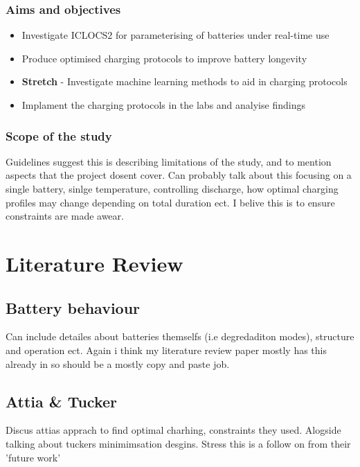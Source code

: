 \documentclass[12pt]{article}
\begin{document}
\subsubsection{Aims and objectives}

\begin{itemize}
\item Investigate ICLOCS2 for parameterising of batteries under real-time use
\item Produce optimised charging protocols to improve battery longevity
\item \textbf{Stretch} - Investigate machine learning methods to aid in charging protocols 
\item Implament the charging protocols in the labs and analyise findings
\end{itemize}

\subsubsection{Scope of the study}

Guidelines suggest this is describing limitations of the study, and to mention aspects that the project dosent cover. Can probably talk about this focusing on a single battery, sinlge temperature, controlling discharge, how optimal charging profiles may change depending on total duration ect. I belive this is to ensure constraints are made awear.

\section{Literature Review}

\subsection{Battery behaviour}

Can include detailes about batteries themselfs (i.e degredaditon modes), structure and operation ect. Again i think my literature review paper mostly has this already in so should be a mostly copy and paste job.

\subsection{Attia \& Tucker}

Discus attias apprach to find optimal charhing, constraints they used. Alogside talking about tuckers minimimsation desgins. Stress this is a follow on from their 'future work' 
\end{document}
